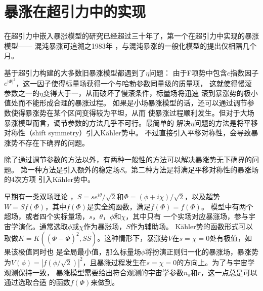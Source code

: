 \section{暴涨在超引力中的实现}
在超引力中嵌入暴涨模型的研究已经超过三十年了，第一个在超引力中实现的暴涨模型——
混沌暴涨可追溯之1983年
\citep{goncharov1984chaotic}，与混沌暴涨的一般化模型的提出仅相隔几个月。 

基于超引力构建的大多数旧暴涨模型\citep{freedman1989progress,deser1976consistent,wess1992supersymmetry}都遇到了$\eta$问题\citep{yamaguchi2011supergravity}：
由于F项势中包含$e$指数因子$e^{{\lvert
\Phi\rvert}^2}$，这一因子使得标量场获得一个与哈勃参数同量级的质量项，
这就使得慢滚参数之一的$\eta$变得大于一，从而破坏了慢滚条件，标量场将迅速
滚到暴涨势的极小值处而不能形成合理的暴涨过程。
如果是小场暴涨模型的话，还可以通过调节参数使得暴涨势在某个区间变得较为平坦，从而
使暴涨过程顺利发生。但对于大场暴涨模型而言，调节参数的方法几乎不可行。最简单的
解决$\eta$问题的方法是将平移对称性（shift symmetry）引入K\"ahler势中\citep{kawasaki2000natural,kawasaki2001natural}。
不过直接引入平移对称性，会导致暴涨势不存在下确界的问题\citep{kawasaki2000natural,kawasaki2001natural}。

除了通过调节参数的方法以外\citep{linde2015single,roest2015cosmological,goncharov1984chaotic}，有两种一般性的方法可以解决暴涨势无下确界的问题。
第一种方法是引入额外的稳定场$S$\citep{kawasaki2000natural,kawasaki2001natural,kallosh2010new,kallosh2011general}。第二种方法是将满足平移对称性的暴涨场的4次方项
引入K\"ahler势中\citep{ketov2016single,ketov2014inflation,izawa2007supersymmetric,ketov2014generic}。

早期有一类双场理论
\citep{kallosh2010new}，$S=s
e^{i\theta}/\sqrt{2}$和$\Phi=(\phi+i\chi)/\sqrt{2}$，以及超势$W=Sf(\Phi)$，其中$f(\Phi)$是实全纯函数，满足$\bar{f}(\Phi)=f(\Phi)$。
模型中有两个超场，或者四个实标量场，$s$，$\theta$，$\phi$和$\chi$，其中只有
一个实场对应暴涨场，参与宇宙学演化。通常选取$\phi$或$\chi$作为暴涨场，$S$作为辅助场。
K\"ahler势的函数形式可以取做$K=K({(\Phi-\bar{\Phi})}^2,S\bar{S})$。这种情形下，暴涨势$V$在$s=\chi=0$处有极值，如果该极值同时也
是全局最小值，那么标量场$\phi$将扮演正则归一化的暴涨场，暴涨势为$V(\phi)=|f(\phi/\sqrt{2})|^2$，且暴涨过程发生在$s=\chi=0$的方向上。为了与宇宙学观测保持一致，
暴涨模型需要给出符合观测的宇宙学参数$n_{s}$和$r$，这一点总是可以通过选取合适
的函数$f(\Phi)$来做到。
